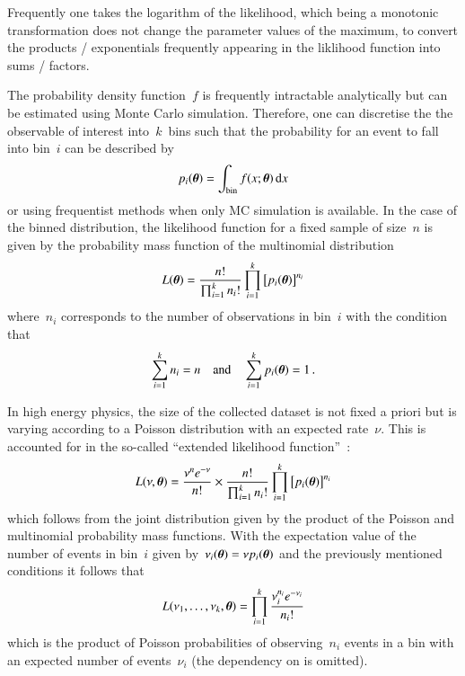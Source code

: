Frequently one takes the logarithm of the likelihood, which being a
monotonic transformation does not change the parameter values of the
maximum, to convert the products / exponentials frequently appearing
in the liklihood function into sums / factors.


The probability density function~$f$ is frequently intractable
analytically but can be estimated using Monte Carlo
simulation. Therefore, one can discretise the the observable of
interest into~$k$~bins such that the probability for an event to fall
into bin~$i$ can be described by
\begin{align*}
  p_i(\boldsymbol{\theta}) = \int_\text{bin} f(x; \boldsymbol{\theta}) \, \mathrm{d}x
\end{align*}
or using frequentist methods when only MC simulation is available. In
the case of the binned distribution, the likelihood function for a
fixed sample of size~$n$ is given by the probability mass function of
the multinomial distribution
\begin{align*}
  L(\boldsymbol{\theta}) = \frac{n!}{\prod_{i=1}^k n_i!} \prod_{i = 1}^k \left[ p_i(\boldsymbol{\theta}) \right]^{n_i}
\end{align*}
where~$n_i$ corresponds to the number of observations in bin~$i$ with
the condition that
\begin{align*}
  \sum_{i = 1}^k n_i = n \quad \text{and} \quad \sum_{i = 1}^k p_i(\boldsymbol{\theta}) = 1 \,\text{.}
\end{align*}

In high energy physics, the size of the collected dataset is not fixed
a priori but is varying according to a Poisson distribution with an
expected rate~$\nu$. This is accounted for in the so-called ``extended
likelihood function''~\cite{cowan1998}:
\begin{align*}
  L(\nu, \boldsymbol{\theta}) =
  \frac{\nu^n e^{-\nu}}{n!} \times \frac{n!}
  {\prod_{i = 1}^k n_{i}!}
  \prod_{i = 1}^k \left[ p_i(\boldsymbol{\theta}) \right]^{n_i}
\end{align*}
which follows from the joint distribution given by the product of the
Poisson and multinomial probability mass functions.  With the
expectation value of the number of events in bin~$i$ given
by~$\nu_i(\boldsymbol{\theta}) = \nu p_i(\boldsymbol{\theta})$ and the previously
mentioned conditions it follows that
\begin{align*}
  L(\nu_1, \dots, \nu_k, \boldsymbol{\theta}) = \prod_{i = 1}^k \frac{\nu_i^{n_i} e^{-\nu_i}}{n_i!}
\end{align*}
which is the product of Poisson probabilities of observing~$n_i$
events in a bin with an expected number of events~$\nu_i$ (the
dependency on \boldtheta is omitted).

